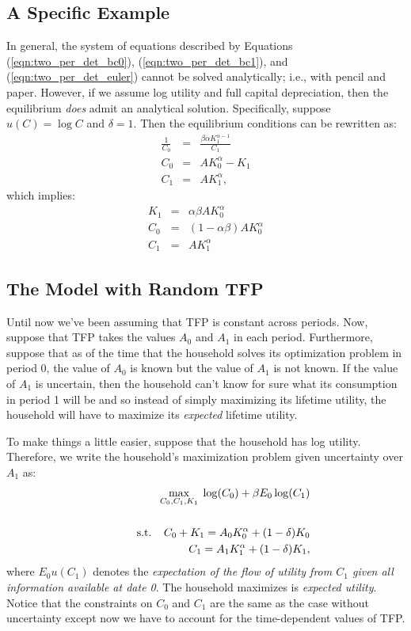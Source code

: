 \documentclass[12pt,fleqn]{article}
\newcommand{\EE}{\begin{eqnarray}}
\newcommand{\FF}{\end{eqnarray}}
\newcommand{\tn}{\textnormal}
\begin{document}
\subsection{A Specific Example}

In general, the system of equations described by Equations (\ref{eqn:two_per_det_bc0}), (\ref{eqn:two_per_det_bc1}), and (\ref{eqn:two_per_det_euler}) cannot be solved analytically; i.e., with pencil and paper. However, if we assume log utility and full capital depreciation, then the equilibrium \emph{does} admit an analytical solution. Specifically, suppose $u(C) = \log C$ and $\delta = 1$. Then the equilibrium conditions can be rewritten as:
	\EE
	\frac{1}{C_0} & = & \frac{\beta\alpha K_1^{\alpha - 1}}{C_1}\\
	C_0 & = & AK_0^{\alpha} - K_1\\
	C_1 & = & AK_1^{\alpha},
	\FF
which implies:
	\EE
	K_1 & = & \alpha \beta AK_0^{\alpha}\\
	C_0 & = & (1-\alpha \beta)A K_0^{\alpha}\\
	C_1 & = & A K_1^{\alpha}
	\FF

\subsection{The Model with Random TFP}


Until now we've been assuming that TFP is constant across periods. Now, suppose that TFP takes the values $A_0$ and $A_1$ in each period. Furthermore, suppose that as of the time that the household solves its optimization problem in period 0, the value of $A_0$ is known but the value of $A_1$ is not known. If the value of $A_1$ is uncertain, then the household can't know for sure what its consumption in period 1 will be and so instead of simply maximizing its lifetime utility, the household will have to maximize its \emph{expected} lifetime utility.


To make things a little easier, suppose that the household has log utility. Therefore, we write the household's maximization problem given uncertainty over $A_1$ as:
	\EE
	&&\max_{C_0,C_1,K_1} \; \log(C_0) + \beta E_0\log (C_1)\\\nonumber\\
	&& \; \; \; \;  \; \; \; \; \tn{s.t.} \; \; \; \; C_0 + K_1 = A_0 K_0^{\alpha}  + (1-\delta)K_0\nonumber\\
	&&\; \; \; \; \; \; \; \; \; \; \; \; \; \; \; \; \; C_1 = A_1 K_1^{\alpha}  + (1-\delta)K_1,\nonumber
	\FF 
where $E_0u(C_1)$ denotes the \emph{expectation of the flow of utility from $C_1$ given all information available at date 0}. The household maximizes is \emph{expected utility}. Notice that the constraints on $C_0$ and $C_1$ are the same as the case without uncertainty except now we have to account for the time-dependent values of TFP.
\end{document}
